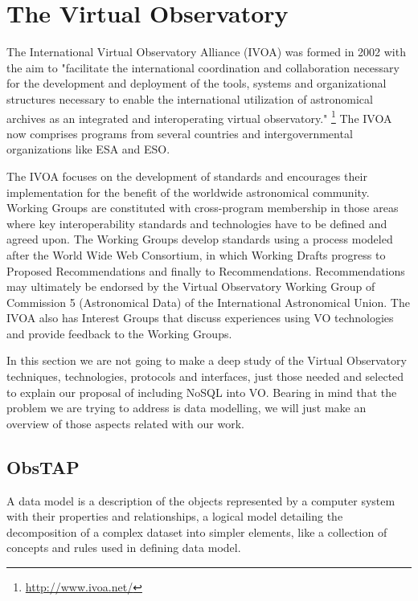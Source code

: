 \chapter{The Virtual Observatory}

The International Virtual Observatory Alliance (IVOA) was formed in 2002 with the aim to "facilitate the international coordination and collaboration necessary for the development and deployment of the tools, systems and organizational structures necessary to enable the international utilization of astronomical archives as an integrated and interoperating virtual observatory." \footnote{\url{http://www.ivoa.net/}} The IVOA now comprises programs from several countries and intergovernmental organizations like ESA and ESO. \newline

The IVOA focuses on the development of standards and encourages their implementation for the benefit of the worldwide astronomical community. Working Groups are constituted with cross-program membership in those areas where key interoperability standards and technologies have to be defined and agreed upon. The Working Groups develop standards using a process modeled after the World Wide Web Consortium, in which Working Drafts progress to Proposed Recommendations and finally to Recommendations. Recommendations may ultimately be endorsed by the Virtual Observatory Working Group of Commission 5 (Astronomical Data) of the International Astronomical Union. The IVOA also has Interest Groups that discuss experiences using VO technologies and provide feedback to the Working Groups. \newline

In this section we are not going to make a deep study of the Virtual Observatory techniques, technologies, protocols and interfaces, just those needed and selected to explain our proposal of including NoSQL into VO. Bearing in mind that the problem we are trying to address is data modelling, we will just make an overview of those aspects related with our work.

\section{ObsTAP}

A data model is a description of the objects represented by a computer system with their properties and relationships, a logical model detailing the decomposition of a complex dataset into simpler elements, like a collection of concepts and rules used in defining data model. \newline

